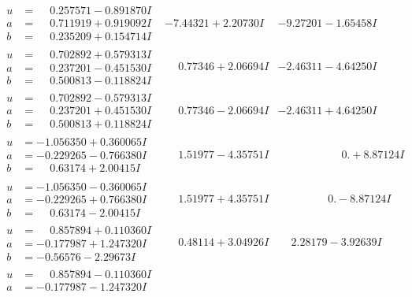 \documentclass[1p]{elsarticle_modified}
\theoremstyle{definition}
\begin{document}
$$\begin{array}{c|c|c}
\begin{aligned}
u &= \phantom{-}0.257571 - 0.891870 I \\
a &= \phantom{-}0.711919 + 0.919092 I \\
b &= \phantom{-}0.235209 + 0.154714 I\end{aligned}
 & -7.44321 + 2.20730 I & -9.27201 - 1.65458 I \\ \hline\begin{aligned}
u &= \phantom{-}0.702892 + 0.579313 I \\
a &= \phantom{-}0.237201 - 0.451530 I \\
b &= \phantom{-}0.500813 - 0.118824 I\end{aligned}
 & \phantom{-}0.77346 + 2.06694 I & -2.46311 - 4.64250 I \\ \hline\begin{aligned}
u &= \phantom{-}0.702892 - 0.579313 I \\
a &= \phantom{-}0.237201 + 0.451530 I \\
b &= \phantom{-}0.500813 + 0.118824 I\end{aligned}
 & \phantom{-}0.77346 - 2.06694 I & -2.46311 + 4.64250 I \\ \hline\begin{aligned}
u &= -1.056350 + 0.360065 I \\
a &= -0.229265 - 0.766380 I \\
b &= \phantom{-}0.63174 + 2.00415 I\end{aligned}
 & \phantom{-}1.51977 - 4.35751 I & \phantom{-0.000000 -}0. + 8.87124 I \\ \hline\begin{aligned}
u &= -1.056350 - 0.360065 I \\
a &= -0.229265 + 0.766380 I \\
b &= \phantom{-}0.63174 - 2.00415 I\end{aligned}
 & \phantom{-}1.51977 + 4.35751 I & \phantom{-0.000000 } 0. - 8.87124 I \\ \hline\begin{aligned}
u &= \phantom{-}0.857894 + 0.110360 I \\
a &= -0.177987 + 1.247320 I \\
b &= -0.56576 - 2.29673 I\end{aligned}
 & \phantom{-}0.48114 + 3.04926 I & \phantom{-}2.28179 - 3.92639 I \\ \hline\begin{aligned}
u &= \phantom{-}0.857894 - 0.110360 I \\
a &= -0.177987 - 1.247320 I \\

\end{aligned}
\end{array}$$
\end{document}
